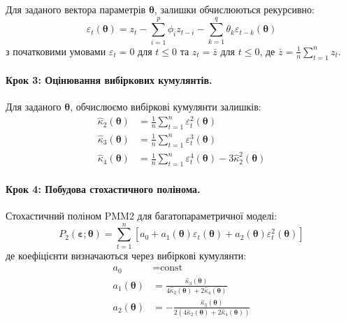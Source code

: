 \documentclass[12pt,a4paper]{article}
\begin{document}
Для заданого вектора параметрів $\boldsymbol{\theta}$, залишки обчислюються рекурсивно:
\begin{equation}
\label{eq:residuals}
\varepsilon_t(\boldsymbol{\theta}) = z_t - \sum_{i=1}^{p} \phi_i z_{t-i} - \sum_{k=1}^{q} \theta_k \varepsilon_{t-k}(\boldsymbol{\theta})
\end{equation}
з початковими умовами $\varepsilon_t = 0$ для $t \leq 0$ та $z_t = \bar{z}$ для $t \leq 0$, де $\bar{z} = \frac{1}{n}\sum_{t=1}^{n} z_t$.

\paragraph{Крок 3: Оцінювання вибіркових кумулянтів.}

Для заданого $\boldsymbol{\theta}$, обчислюємо вибіркові кумулянти залишків:
\begin{align}
\hat{\kappa}_2(\boldsymbol{\theta}) &= \frac{1}{n} \sum_{t=1}^{n} \varepsilon_t^2(\boldsymbol{\theta}) \label{eq:sample_k2} \\
\hat{\kappa}_3(\boldsymbol{\theta}) &= \frac{1}{n} \sum_{t=1}^{n} \varepsilon_t^3(\boldsymbol{\theta}) \label{eq:sample_k3} \\
\hat{\kappa}_4(\boldsymbol{\theta}) &= \frac{1}{n} \sum_{t=1}^{n} \varepsilon_t^4(\boldsymbol{\theta}) - 3\hat{\kappa}_2^2(\boldsymbol{\theta}) \label{eq:sample_k4}
\end{align}

\paragraph{Крок 4: Побудова стохастичного полінома.}

Стохастичний поліном PMM2 для багатопараметричної моделі:
\begin{equation}
\label{eq:pmm2_multivariate}
P_2(\boldsymbol{\varepsilon}; \boldsymbol{\theta}) = \sum_{t=1}^{n} \left[ a_0 + a_1(\boldsymbol{\theta}) \varepsilon_t(\boldsymbol{\theta}) + a_2(\boldsymbol{\theta}) \varepsilon_t^2(\boldsymbol{\theta}) \right]
\end{equation}
де коефіцієнти визначаються через вибіркові кумулянти:
\begin{align}
a_0 &= \text{const} \label{eq:a0_arima} \\
a_1(\boldsymbol{\theta}) &= \frac{\hat{\kappa}_3(\boldsymbol{\theta})}{4\hat{\kappa}_2(\boldsymbol{\theta}) + 2\hat{\kappa}_4(\boldsymbol{\theta})} \label{eq:a1_arima} \\
a_2(\boldsymbol{\theta}) &= -\frac{\hat{\kappa}_3(\boldsymbol{\theta})}{2(4\hat{\kappa}_2(\boldsymbol{\theta}) + 2\hat{\kappa}_4(\boldsymbol{\theta}))} \label{eq:a2_arima}
\end{align}
\end{document}
